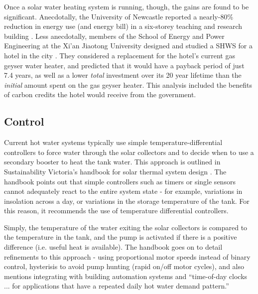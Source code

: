 Once a solar water heating system is running, though, the gains are found to be significant.
Anecdotally, the University of Newcastle reported a nearly-80\% reduction in energy use (and energy bill) in a six-storey teaching and research building \cite{ApricusNewcastle}.
Less anecdotally, members of the School of Energy and Power Engineering at the Xi'an Jiaotong University designed and studied a SHWS for a hotel in the city \cite{Cao14}.
They considered a replacement for the hotel's current gas geyser water heater, and predicted that it would have a payback period of just 7.4 years, as well as a lower {\it total} investment over its 20 year lifetime than the {\it initial} amount spent on the gas geyser heater.
This analysis included the benefits of carbon credits the hotel would receive from the government.

\subsection{Control}

Current hot water systems typically use simple temperature-differential controllers to force water through the solar collectors and to decide when to use a secondary booster to heat the tank water.
This approach is outlined in Sustainability Victoria's handbook for solar thermal system design \cite{LSTS}.
The handbook points out that simple controllers such as timers or single sensors cannot adequately react to the entire system state - for example, variations in insolation across a day, or variations in the storage temperature of the tank.
For this reason, it recommends the use of temperature differential controllers.

Simply, the temperature of the water exiting the solar collectors is compared to the temperature in the tank, and the pump is activated if there is a positive difference (i.e. useful heat is available).
The handbook goes on to detail refinements to this approach - using proportional motor speeds instead of binary control, hysterisis to avoid pump hunting (rapid on/off motor cycles), and also mentions integrating with building automation systems and ``time-of-day clocks ... for applications that have a repeated daily hot water demand pattern.''
